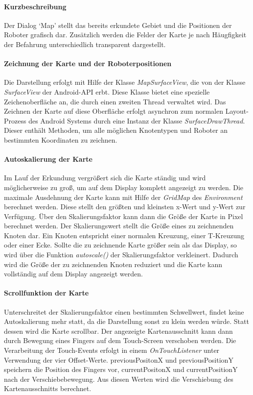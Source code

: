 \documentclass[10pt,a4paper]{article}
\begin{document}
	\paragraph*{Kurzbeschreibung} Der Dialog `Map' stellt das bereits erkundete Gebiet und die Positionen der Roboter grafisch dar. Zusätzlich werden
	die Felder der Karte je nach Häugfigkeit der Befahrung unterschiedlich transparent dargestellt.
	
	\paragraph*{Zeichnung der Karte und der Roboterpositionen}
	Die Darstellung erfolgt mit Hilfe der Klasse \textit{MapSurfaceView}, die von der Klasse \textit{SurfaceView} der Android-API erbt. Diese Klasse
	bietet eine spezielle Zeichenoberfläche an, die durch einen zweiten Thread verwaltet wird. Das Zeichnen der Karte auf diese Oberfläche erfolgt
	asynchron zum normalen Layout-Prozess des Android Systems durch eine Instanz der Klasse \textit{SurfaceDrawThread}.
	Dieser enthält Methoden, um alle möglichen Knotentypen und Roboter an bestimmten Koordinaten zu zeichnen.
	
	\paragraph*{Autoskalierung der Karte}
	Im Lauf der Erkundung vergrößert sich die Karte ständig und wird möglicherweise zu groß, um auf dem Display komplett angezeigt zu werden.
    Die maximale Ausdehnung der Karte kann mit Hilfe der \textit{GridMap} des \textit{Environment} berechnet werden. Diese stellt den größten und
    kleinsten x-Wert und y-Wert zur Verfügung. Über den Skalierungsfaktor kann dann die Größe der Karte in Pixel berechnet werden. Der
    Skalierungswert stellt die Größe eines zu zeichnenden Knoten dar. Ein Knoten entspricht einer normalen Kreuzung, einer T-Kreuzung oder
    einer Ecke.
	Sollte die zu zeichnende Karte größer sein als das Display, so wird über die Funktion \textit{autoscale()} der Skalierungsfaktor verkleinert.
	Dadurch wird die Größe der zu zeichnenden Knoten reduziert und die Karte kann vollständig auf dem Display angezeigt werden. 
	
	\paragraph*{Scrollfunktion der Karte}
	Unterschreitet der Skalierungsfaktor einen bestimmten Schwellwert, findet keine Autoskalierung mehr statt, da die Darstellung sonst zu klein
	werden würde. Statt dessen wird die Karte scrollbar. Der angezeigte Kartenausschnitt kann dann durch Bewegung eines Fingers auf dem Touch-Screen
	verschoben werden.
	Die Verarbeitung der Touch-Events erfolgt in einem \textit{OnTouchListener} unter Verwendung der vier Offset-Werte. previousPositonX und
	previousPositionY speichern die Position des Fingers vor, currentPositonX und currentPositionY nach der Verschiebebewegung. Aus diesen Werten
	wird die Verschiebung des Kartenausschnitts berechnet.
	
\end{document}
